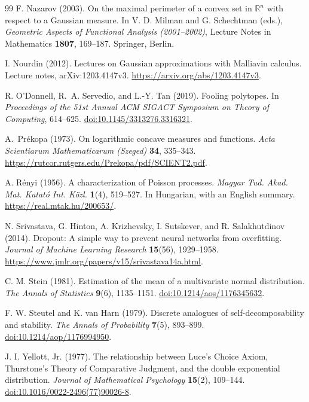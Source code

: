 \documentclass[11pt,letterpaper,twoside,leqno]{article}
\theoremstyle{bookplain}
\theoremstyle{bookremark}
\newcommand{\R}{\mathbb R}
\begin{document}
\begin{thebibliography}{99}
F. Nazarov (2003).
On the maximal perimeter of a convex set in \(\R^n\)
with respect to a Gaussian measure.
In V. D. Milman and G. Schechtman (eds.),
\emph{Geometric Aspects of Functional Analysis (2001--2002)},
Lecture Notes in Mathematics \textbf{1807}, 169--187.
Springer, Berlin.

I. Nourdin (2012).
Lectures on Gaussian approximations with Malliavin calculus.
Lecture notes, arXiv:1203.4147v3.
\url{https://arxiv.org/abs/1203.4147v3}.

R. O'Donnell, R.~A. Servedio, and L.-Y. Tan (2019).
Fooling polytopes.
In \emph{Proceedings of the 51st Annual ACM SIGACT Symposium on
Theory of Computing}, 614--625.
\href{https://doi.org/10.1145/3313276.3316321}{doi:10.1145/3313276.3316321}.

A.~Pr\'ekopa (1973).
On logarithmic concave measures and functions.
\emph{Acta Scientiarum Mathematicarum (Szeged)} \textbf{34}, 335--343.
\url{https://rutcor.rutgers.edu/Prekopa/pdf/SCIENT2.pdf}.

A. R\'enyi (1956).
A characterization of Poisson processes.
\emph{Magyar Tud. Akad. Mat. Kutat\'o Int. K\"ozl.} \textbf{1}(4), 519--527.
In Hungarian, with an English summary.
\url{https://real.mtak.hu/200653/}.

N. Srivastava, G. Hinton, A. Krizhevsky, I. Sutskever, and
R. Salakhutdinov (2014).
Dropout: A simple way to prevent neural networks from overfitting.
\emph{Journal of Machine Learning Research} \textbf{15}(56), 1929--1958.
\url{https://www.jmlr.org/papers/v15/srivastava14a.html}.

C. M. Stein (1981).
Estimation of the mean of a multivariate normal distribution.
\emph{The Annals of Statistics} \textbf{9}(6), 1135--1151.
\href{https://doi.org/10.1214/aos/1176345632}{doi:10.1214/aos/1176345632}.

F. W. Steutel and K. van Harn (1979).
Discrete analogues of self-decomposability and stability.
\emph{The Annals of Probability} \textbf{7}(5), 893--899.
\href{https://doi.org/10.1214/aop/1176994950}{doi:10.1214/aop/1176994950}.

J. I. Yellott, Jr. (1977).
The relationship between Luce's Choice Axiom, Thurstone's Theory
of Comparative Judgment, and the double exponential distribution.
\emph{Journal of Mathematical Psychology} \textbf{15}(2), 109--144.
\href{https://doi.org/10.1016/0022-2496(77)90026-8}{doi:10.1016/0022-2496(77)90026-8}.

\end{thebibliography}
\end{document}

